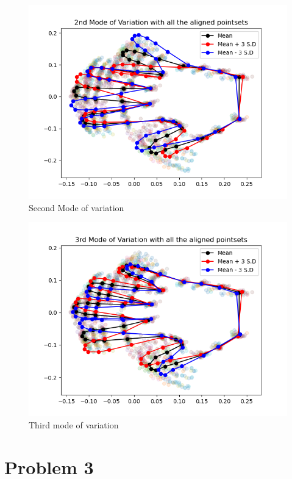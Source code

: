 \documentclass{article}
\begin{document}
\begin{figure}[H]
    \centerline{\includegraphics[scale=0.45]{../results/hand/mean-and-second-mode_2.png}}
    \caption{Second Mode of variation}
\end{figure}

\begin{figure}[H]
    \centerline{\includegraphics[scale=0.45]{../results/hand/mean-and-third-mode_2.png}}
    \caption{Third mode of variation}
\end{figure}



\newpage
\thispagestyle{fancy}
\section{Problem 3}
\end{document}

